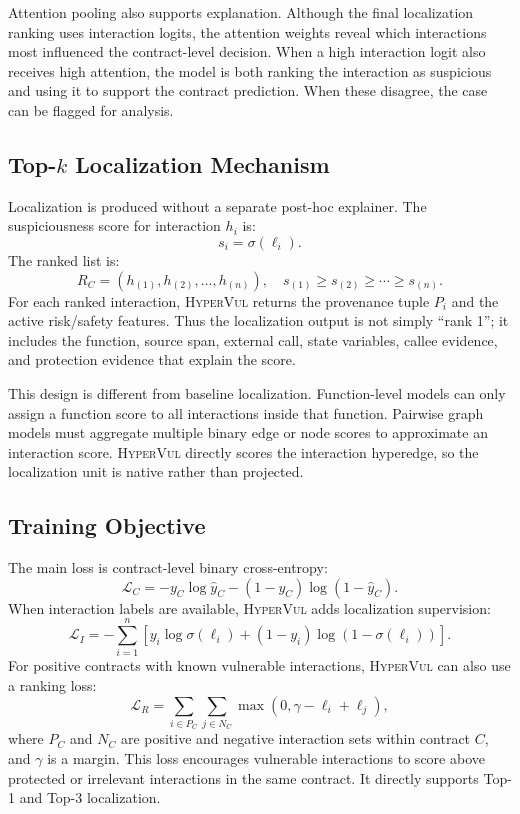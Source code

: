 \documentclass[conference]{IEEEtran}
\newcommand{\tool}{\textsc{HyperVul}}
\begin{document}
Attention pooling also supports explanation. Although the final localization ranking uses interaction logits, the attention weights reveal which interactions most influenced the contract-level decision. When a high interaction logit also receives high attention, the model is both ranking the interaction as suspicious and using it to support the contract prediction. When these disagree, the case can be flagged for analysis.

\subsection{Top-$k$ Localization Mechanism}

Localization is produced without a separate post-hoc explainer. The suspiciousness score for interaction $h_i$ is:
\begin{equation}
s_i=\sigma(\ell_i).
\end{equation}
The ranked list is:
\begin{equation}
R_C=(h_{(1)},h_{(2)},\ldots,h_{(n)}), \quad
s_{(1)}\geq s_{(2)}\geq \cdots \geq s_{(n)}.
\end{equation}
For each ranked interaction, \tool{} returns the provenance tuple $P_i$ and the active risk/safety features. Thus the localization output is not simply ``rank 1''; it includes the function, source span, external call, state variables, callee evidence, and protection evidence that explain the score.

This design is different from baseline localization. Function-level models can only assign a function score to all interactions inside that function. Pairwise graph models must aggregate multiple binary edge or node scores to approximate an interaction score. \tool{} directly scores the interaction hyperedge, so the localization unit is native rather than projected.

\subsection{Training Objective}

The main loss is contract-level binary cross-entropy:
\begin{equation}
\mathcal{L}_{C}=-y_C\log \hat{y}_C-(1-y_C)\log(1-\hat{y}_C).
\end{equation}
When interaction labels are available, \tool{} adds localization supervision:
\begin{equation}
\mathcal{L}_{I}=-\sum_{i=1}^{n}\left[y_i\log \sigma(\ell_i)+(1-y_i)\log(1-\sigma(\ell_i))\right].
\end{equation}
For positive contracts with known vulnerable interactions, \tool{} can also use a ranking loss:
\begin{equation}
\mathcal{L}_{R}=\sum_{i\in P_C}\sum_{j\in N_C}
\max(0,\gamma-\ell_i+\ell_j),
\end{equation}
where $P_C$ and $N_C$ are positive and negative interaction sets within contract $C$, and $\gamma$ is a margin. This loss encourages vulnerable interactions to score above protected or irrelevant interactions in the same contract. It directly supports Top-1 and Top-3 localization.
\end{document}
